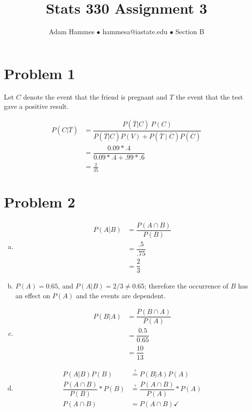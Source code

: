 \documentclass[11pt]{article}
\begin{document}
\title{Stats 330 Assignment 3}
\author{Adam Hammes $\bullet$ hammesa@iastate.edu $\bullet$ Section B}
\maketitle

\section*{Problem 1}
Let $C$ denote the event that the friend is pregnant and $T$ the event that the test gave a positive result.

\begin{align*}
	P(C | \overline{T}) &= \dfrac{P(\overline{T} | C)\ P(C)}{P(\overline{T}|C)P(V)+P(\overline{T} \mid \overline{C})P(\overline{C})}\\
	&= \dfrac{0.09 * .4}{0.09 * .4 + .99 * .6}\\
	&= \frac{2}{35}
\end{align*}

\section*{Problem 2}
\begin{enumerate}[(a)]
	\item
	\begin{align*}
		P(A|B) &= \dfrac{P(A \cap B)}{P(B)} \\
		&= \dfrac{.5}{.75} \\
		&= \dfrac{2}{3}
	\end{align*}
	
	\item
	$P(A) = 0.65$, and $P(A|B) = 2/3 \neq 0.65$; therefore the occurrence of $B$ has an effect on $P(A)$ and the events are dependent.
	
	\item
	\begin{align*}
		P(B|A) &= \dfrac{P(B \cap A)}{P(A)} \\
		&= \dfrac{0.5}{0.65} \\
		&= \dfrac{10}{13}
	\end{align*}
	
	\item
	\begin{align*}
		P(A|B)P(B) &\overset{?}{=} P(B|A)P(A) \\
		\dfrac{P(A \cap B)}{P(B)} * P(B) &\overset{?}{=} \dfrac{P(A \cap B)}{P(A)} * P(A) \\
		P(A \cap B) &= P(A \cap B) \checkmark
	\end{align*}
\end{enumerate}
\end{document}
